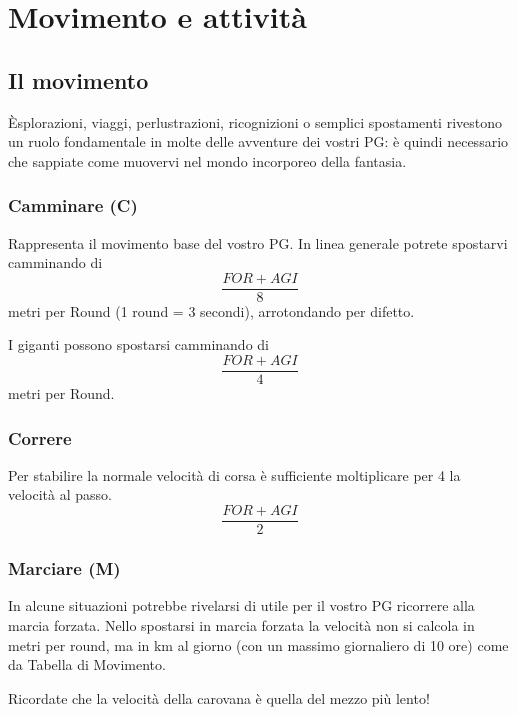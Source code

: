 \chapter{Movimento e attivit\`a} 

\section{Il movimento}
\label{movimento}
\iffullversion

\`Esplorazioni, viaggi, perlustrazioni, ricognizioni o semplici
spostamenti rivestono un ruolo fondamentale in molte delle avventure
dei vostri PG: \`e quindi necessario che sappiate come muovervi nel
mondo incorporeo della fantasia.

\fi

\subsection{Camminare (C)}

Rappresenta il movimento base del vostro PG. In linea generale potrete
spostarvi camminando di $$\frac{FOR + AGI}{8}$$
metri per Round (1
round = 3 secondi), arrotondando per difetto. 

I giganti possono spostarsi camminando di $$\frac{FOR + AGI}{4}$$
metri per Round.


\iffullversion
\subsection{Correre}

Per stabilire la normale velocit\`a
di corsa \`e sufficiente moltiplicare per 4 la velocit\`a al passo.
$$\frac{FOR + AGI}{2}$$

\subsection{Marciare (M)} 

In alcune situazioni potrebbe rivelarsi di utile per il vostro PG
ricorrere alla marcia forzata. Nello spostarsi in marcia forzata la
velocit\`a non si calcola in metri per round, ma in km al giorno (con
un massimo giornaliero di 10 ore) come da Tabella di Movimento.

Ricordate che la velocit\`a della carovana \`e quella del mezzo pi\`u
lento!
\fi

